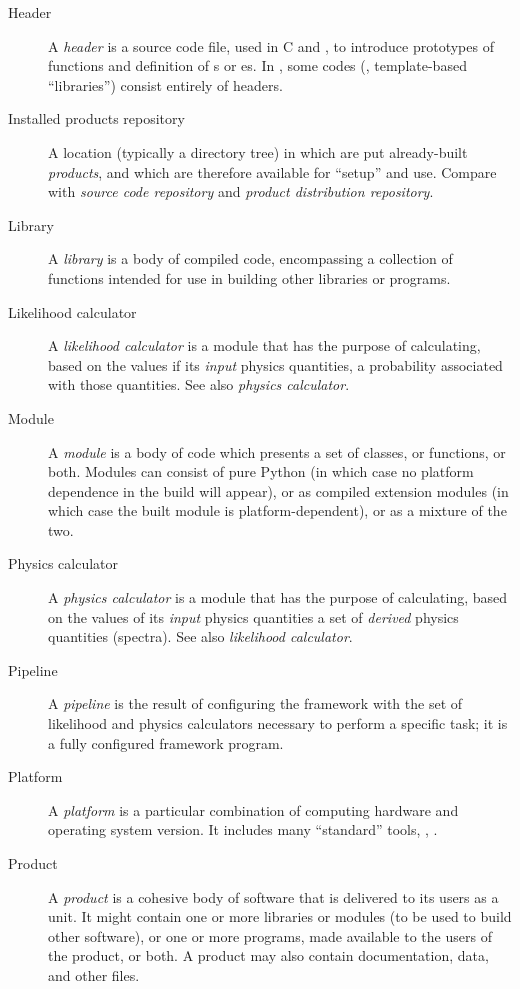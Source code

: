 \documentclass{memarticle}
\begin{document}
\begin{description}
\item[Header] A \emph{header} is a source code file, used in C and \cpp,
  to introduce prototypes of functions and definition of s
  or es. In \cpp, some codes (\eg, template-based
  ``libraries'') consist entirely of headers.

\item[Installed products repository] A location (typically a directory
  tree) in which are put already-built \emph{products}, and which are
  therefore available for ``setup'' and use. Compare with \emph{source
    code repository} and \emph{product distribution repository}.

\item[Library] A \emph{library} is a body of compiled code, encompassing
  a collection of functions intended for use in building other libraries
  or programs.

\item[Likelihood calculator] A \emph{likelihood calculator} is a module
  that has the purpose of calculating, based on the values if its
  \emph{input} physics quantities, a probability associated with those
  quantities. See also \emph{physics calculator}.

\item[Module] A \emph{module} is a body of code which presents a set of
  classes, or functions, or both. Modules can consist of pure Python (in
  which case no platform dependence in the build will appear), or as
  compiled extension modules (in which case the built module is
  platform-dependent), or as a mixture of the two.

\item[Physics calculator] A \emph{physics calculator} is a module that
  has the purpose of calculating, based on the values of its
  \emph{input} physics quantities a set of \emph{derived} physics
  quantities (\eg spectra). See also \emph{likelihood calculator}.

\item[Pipeline] A \emph{pipeline} is the result of
  configuring the framework with the set of likelihood and physics
  calculators necessary to perform a specific task; it is a fully
  configured framework program.

\item[Platform] A \emph{platform} is a particular combination of
  computing hardware and operating system version. It includes many
  ``standard'' tools, \eg, .

\item[Product] A \emph{product} is a cohesive body of software that is
  delivered to its users as a unit. It might contain one or more
  libraries or modules (to be used to build other software), or one or
  more programs, made available to the users of the product, or both. A
  product may also contain documentation, data, and other files.


\end{description}
\end{document}
